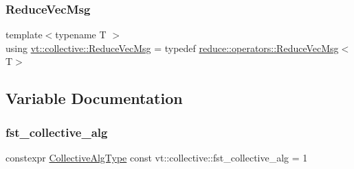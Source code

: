 \subsubsection{\texorpdfstring{Reduce\+Vec\+Msg}{ReduceVecMsg}}
{\footnotesize\ttfamily template$<$typename T $>$ \\
using \hyperlink{namespacevt_1_1collective_a711b5dd8547fee4b63077f44188959f4}{vt\+::collective\+::\+Reduce\+Vec\+Msg} = typedef \hyperlink{structvt_1_1collective_1_1reduce_1_1operators_1_1_reduce_vec_msg}{reduce\+::operators\+::\+Reduce\+Vec\+Msg}$<$T$>$}



\subsection{Variable Documentation}
\mbox{\label{namespacevt_1_1collective_a162001be7dbe7f94163297a57f6b53e8}} 
\subsubsection{\texorpdfstring{fst\+\_\+collective\+\_\+alg}{fst\_collective\_alg}}
{\footnotesize\ttfamily constexpr \hyperlink{namespacevt_a5ffcf8e168b77b0f36e11b616049a1cf}{Collective\+Alg\+Type} const vt\+::collective\+::fst\+\_\+collective\+\_\+alg = 1}

